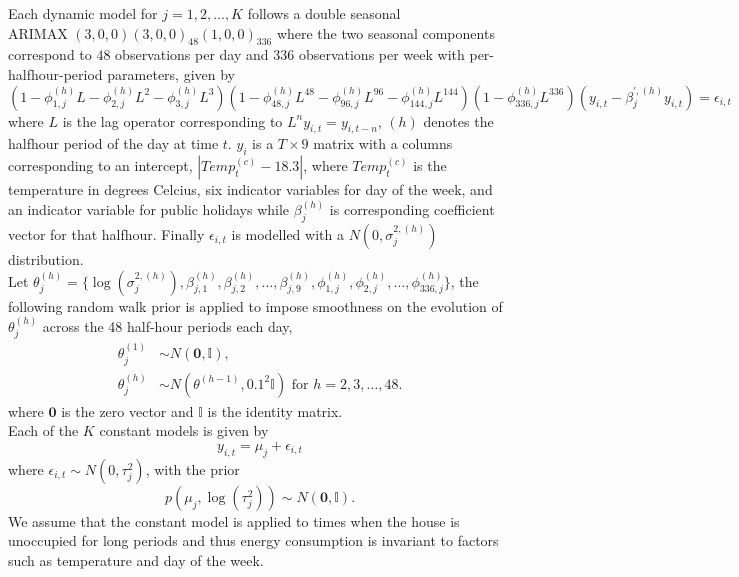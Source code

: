 \documentclass[
12pt, %
onehalfspacing, %
nohyperref, %
headsepline, %
chapterinoneline, %
]{MastersDoctoralThesis} %
\begin{document}
Each dynamic model for $j = 1, 2, \dots, K$ follows a double seasonal \\ ARIMAX $(3, 0, 0)(3, 0, 0)_{48}(1, 0, 0)_{336}$ where the two seasonal components correspond to $48$ observations per day and $336$ observations per week with per-halfhour-period parameters, given by
\begin{equation}
\label{elec:dynamicModel}
(1 - \phi_{1, j}^{(h)}L - \phi_{2, j}^{(h)}L^2 - \phi_{3, j}^{(h)} L^3)(1 - \phi_{48, j}^{(h)}L^{48} - \phi_{96, j}^{(h)}L^{96} - \phi_{144, j}^{(h)}L^{144})(1 - \phi_{336, j}^{(h)}L^{336}) (y_{i, t} -  \beta^{\prime, {(h)}}_{j} y_{i, t}) = \epsilon_{i, t}
\end{equation}
where $L$ is the lag operator corresponding to $L^n y_{i, t} = y_{i, t- n}$, $(h)$ denotes the halfhour period of the day at time $t$. $y_{i}$ is a $T \times 9$ matrix with a columns corresponding to an intercept, $|Temp^{(c)}_{t} - 18.3|$, where $Temp^{(c)}_{t}$ is the temperature in degrees Celcius, six indicator variables for day of the week, and an indicator variable for public holidays while $\beta_{j}^{(h)}$ is corresponding coefficient vector for that halfhour. Finally $\epsilon_{i, t}$ is modelled with a $N(0, \sigma^{2, (h)}_{j})$ distribution.
\\

Let $\theta^{(h)}_j = \{\log(\sigma^{2, (h)}_{j}), \beta_{j, 1}^{(h)}, \beta_{j, 2}^{(h)}, \dots, \beta_{j, 9}^{(h)}, \phi_{1, j}^{(h)}, \phi_{2, j}^{(h)}, \dots, \phi_{336, j}^{(h)}\}$, the following random walk prior is applied to impose smoothness on the evolution of $\theta^{(h)}_j$ across the 48 half-hour periods each day,
\begin{align}
\label{elec:dynamicPrior}
\theta^{(1)}_j &\sim N(\boldsymbol{0}, \mathbb{I}), \\
\theta^{(h)}_j &\sim N(\theta^{(h-1)}, 0.1^2 \mathbb{I}) \mbox{ for } h = 2, 3, \dots, 48.
\end{align}
where $\boldsymbol{0}$ is the zero vector and $\mathbb{I}$ is the identity matrix.
\\

Each of the $K$ constant models is given by
\begin{equation}
\label{elec:constantModel}
y_{i, t} = \mu_j + \epsilon_{i, t}
\end{equation}
where $\epsilon_{i, t} \sim N(0, \tau^2_{j})$, with the prior
\begin{equation}
\label{elec:constantPrior}
p(\mu_j, \log(\tau_j^2))\sim N(\boldsymbol{0}, \mathbb{I}).
\end{equation}
We assume that the constant model is applied to times when the house is unoccupied for long periods and thus energy consumption is invariant to factors such as temperature and day of the week.
\\
\end{document}
